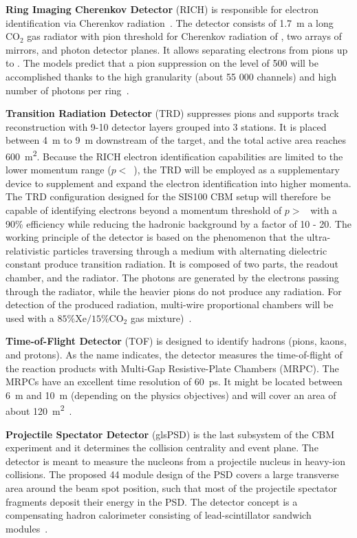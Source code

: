 \textbf{Ring Imaging Cherenkov Detector} (\gls{RICH}) is responsible for electron identification via Cherenkov radiation~\cite{RICH}. The detector consists of \SI{1.7}{\metre} a long $\mathrm{CO_{2}}$ gas radiator with pion threshold for Cherenkov radiation of , two arrays of mirrors, and photon detector planes. It allows separating electrons from pions up to . The models predict that a pion suppression on the level of 500 will be accomplished thanks to the high granularity (about 55 000 channels) and high number of photons per ring~\cite{RICH}.\bigbreak

\textbf{Transition Radiation Detector} (\gls{TRD}) suppresses pions and  supports track reconstruction with 9-10 detector layers grouped into 3 stations. It is placed between \SI{4}{\metre} to \SI{9}{\metre} downstream of the target, and the total active area reaches \SI{600}{\square\metre}. Because the RICH electron identification capabilities are limited to the lower momentum range ($p < $~), the TRD will be employed as a supplementary device to supplement and expand the electron identification into higher momenta. The TRD configuration designed for the SIS100 CBM setup will therefore be capable of identifying electrons beyond a momentum threshold of $p > $~ with a 90\% efficiency while reducing the hadronic background by a factor of 10 - 20. The working principle of the detector is based on the phenomenon that the ultra-relativistic particles traversing through a medium with alternating dielectric constant produce transition radiation. It is composed of two parts, the readout chamber, and the radiator. The photons are generated by the electrons passing through the radiator, while the heavier pions do not produce any radiation. For detection of the produced radiation, multi-wire proportional chambers will be used with a $\mathrm{85\% Xe/15\% CO_{2}}$ gas mixture)~\cite{TRD}. \bigbreak

\textbf{Time-of-Flight Detector} (\gls{TOF}) is designed to identify hadrons (pions, kaons, and protons). As the name indicates, the detector measures the time-of-flight of the reaction products with Multi-Gap Resistive-Plate Chambers (\gls{MRPC}). The \glspl{MRPC} have an excellent time resolution of \SI{60}{\pico\second}.  It might be located between \SI{6}{\metre} and \SI{10}{\metre} (depending on the physics objectives) and will cover an area of about \SI{120}{\square\metre}~\cite{TOF}. \bigbreak

\textbf{Projectile Spectator Detector} (gls{PSD}) is the last subsystem of the \gls{CBM} experiment and it determines the collision centrality and event plane. The detector is meant to measure the nucleons from a projectile nucleus in heavy-ion collisions. The proposed 44 module design of the PSD covers a large transverse area around the beam spot position, such that most of the projectile spectator fragments deposit their energy in the \gls{PSD}. The detector concept is a compensating hadron calorimeter consisting of lead-scintillator sandwich modules~\cite{PSD}.\bigbreak


